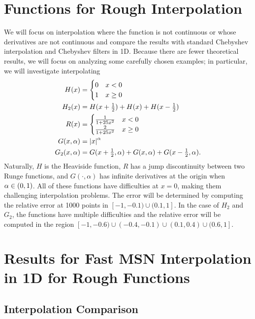 \section{Functions for Rough Interpolation}

We will focus on interpolation where the function is not continuous
or whose derivatives are not continuous and compare the results
with standard Chebyshev interpolation and Chebyshev filters in 1D.
Because there are fewer theoretical results, we will focus on analyzing
some carefully chosen examples; in particular, we will
investigate interpolating
%
\begin{align}
    H(x) &= \begin{cases} 0 &x<0 \\ 1 &x\ge0 \end{cases} \nonumber\\
    H_{2}(x) &= H(x+\tfrac{1}{2}) + H(x) + H(x-\tfrac{1}{2}) \nonumber\\
    R(x) &= \begin{cases} \frac{1}{1+25x^{2}} &x<0 \\
                          \frac{2}{1+25x^{2}} &x\ge0 \end{cases} \nonumber\\
    G(x,\alpha) &= \left| x \right|^{\alpha} \nonumber\\
    G_{2}(x,\alpha) &= G(x+\tfrac{1}{2},\alpha) + G(x,\alpha) +
        G(x-\tfrac{1}{2},\alpha).
\end{align}
%
Naturally, $H$ is the Heaviside function, $R$ has a jump discontinuity
between two Runge functions, and $G(\cdot,\alpha)$
has infinite derivatives at the origin when
$\alpha\in\left( 0,1 \right)$.
All of these functions have difficulties at $x=0$, making them
challenging interpolation problems.
The error will be determined by computing the relative error at 1000 points
in $[-1,-0.1)\cup(0.1,1]$.
In the case of $H_{2}$ and $G_{2}$, the functions have multiple difficulties
and the relative error will be computed in the region
$[-1,-0.6)\cup(-0.4,-0.1)\cup(0.1,0.4)\cup(0.6,1]$.

\section{Results for Fast MSN Interpolation in 1D for Rough Functions}
\label{sec:rough_1D_sim}

\subsection{Interpolation Comparison}

